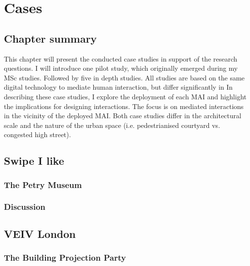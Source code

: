 \chapter{Cases}
\label{chapterlabel5}

\section*{Chapter summary}

This chapter will present the conducted case studies in support of the research questions. I will introduce one pilot study, which originally emerged during my MSc studies. Followed by five in depth studies.  All studies are based on the same digital technology to mediate human interaction, but differ significantly in In describing these case studies, I explore the deployment of each MAI and highlight the implications for designing interactions. The focus is on mediated interactions in the vicinity of the deployed MAI. Both case studies differ in the architectural scale and the nature of the urban space (i.e. pedestrianised courtyard vs. congested high street). \newpage

\section{Swipe I like}

\subsection{The Petry Museum}


\subsection{Discussion}



\section{VEIV London}

\subsection{The Building Projection Party}

